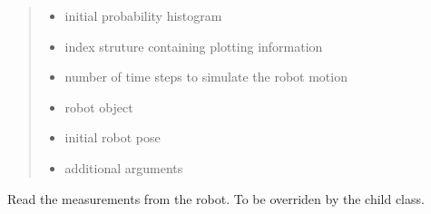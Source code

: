 \documentclass[letterpaper,10pt,english]{sphinxmanual}
\begin{document}
\begin{fulllineitems}
\begin{fulllineitems}
\begin{quote}
\begin{description}
\begin{itemize}
\item {} 
\sphinxAtStartPar
{} \textendash{} initial probability histogram

\item {} 
\sphinxAtStartPar
{} \textendash{} index struture containing plotting information

\item {} 
\sphinxAtStartPar
{} \textendash{} number of time steps to simulate the robot motion

\item {} 
\sphinxAtStartPar
{} \textendash{} robot object

\item {} 
\sphinxAtStartPar
{} \textendash{} initial robot pose

\item {} 
\sphinxAtStartPar
{} \textendash{} additional arguments

\end{itemize}

\end{description}\end{quote}

\end{fulllineitems}


\begin{fulllineitems}
\label{\detokenize{GridLocalization:GL.GL.GetMeasurements}}
\pysigstartsignatures
{}
\pysigstopsignatures
\sphinxAtStartPar
Read the measurements from the robot. To be overriden by the child class.

\end{fulllineitems}



\end{fulllineitems}
\end{document}
